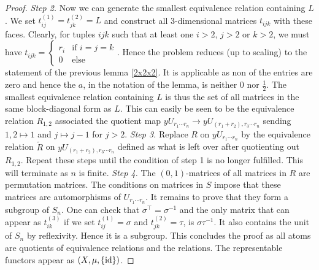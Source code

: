 \documentclass[a4paper]{amsproc}
\theoremstyle{plain}
\theoremstyle{definition}
\theoremstyle{remark}
\numberwithin{equation}{section}
\newcommand{\id}{\textup{id}}
\begin{document}
\begin{proof}
\emph{Step 2.} Now we can generate the smallest equivalence relation containing $L$. We set $t_{ij}^{(1)}=t^{(2)}_{jk}=L$ and construct all 3-dimensional matrices $t_{ijk}$ with these faces. Clearly, for tuples $ijk$ such that at least one $i>2$, $j>2$ or $k>2$, we must have $t_{ijk}=\begin{cases} r_i &\text{if }i=j=k \\ 0 &\text{else}  \end{cases}$. Hence the problem reduces (up to scaling) to the statement of the previous lemma \ref{2x2x2}. It is applicable as non of the entries are zero and hence the $a$, in the notation of the lemma, is neither $0$ nor $\frac{1}{2}$. The smallest equivalence relation containing $L$ is thus the set of all matrices in the same block-diagonal form as $L$. This can easily be seen to be the equivalence relation $R_{1,2}$ associated the quotient map  $yU_{r_1\cdots r_n}\rightarrow yU_{(r_1+r_2),r_3\cdots r_n}$ sending $1, 2\mapsto 1$ and $j\mapsto j-1$ for $j> 2$.
\newline
\newline
\emph{Step 3.} Replace $R$ on $yU_{r_1\cdots r_n}$ by  the equivalence relation $\tilde{R}$ on $yU_{(r_1+r_2),r_3\cdots r_n}$ defined as what is left over after quotienting out $R_{1,2}$. Repeat these steps until the condition of step 1 is no longer fulfilled. This will terminate as $n$ is finite.\newline
\newline
\emph{Step 4.} The $(0,1)$-matrices of all matrices in $R$ are permutation matrices. The conditions on matrices in $S$ impose that these matrices are automorphisms of $U_{r_1\cdots r_n}$. It remains to prove that they form a subgroup of $S_n$. One can check that $\sigma^\top=\sigma^{-1}$ and the only matrix that can appear as $t^{(3)}_{ik}$ if we set $t^{(1)}_{ij}=\sigma$ and $t^{(2)}_{jk}=\tau$, is $\sigma \tau^{-1}$. It also contains the unit of $S_n$ by reflexivity. Hence it is a subgroup.
\newline
\newline
This concludes the proof as all atoms are quotients of equivalence relations and the relations. The representable functors appear as $(X,\mu, \{\id\})$.
\end{proof}
\end{document}
